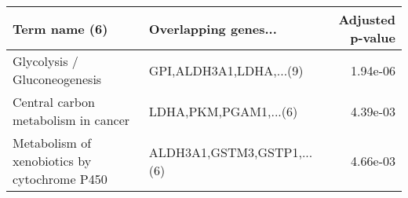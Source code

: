 \begin{tabular}{llr}
\toprule
                               Term name (6) &       Overlapping genes... &  Adjusted p-value \\
\midrule
                Glycolysis / Gluconeogenesis &    GPI,ALDH3A1,LDHA,...(9) &          1.94e-06 \\
         Central carbon metabolism in cancer &      LDHA,PKM,PGAM1,...(6) &          4.39e-03 \\
Metabolism of xenobiotics by cytochrome P450 & ALDH3A1,GSTM3,GSTP1,...(6) &          4.66e-03 \\
\bottomrule
\end{tabular}
